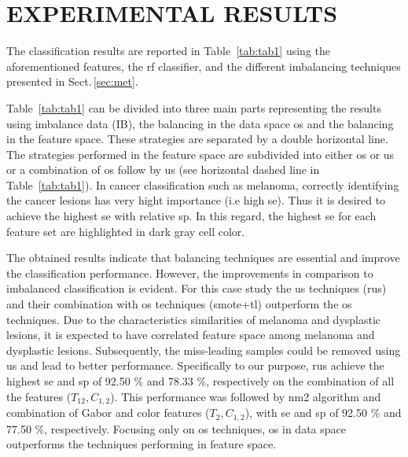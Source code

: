 \graphicspath{ {./content/Experiments-results/figures/} }


\section{\uppercase{Experimental Results}}
\label{sec:exp-res} 

\noindent The classification results are reported in Table~\ref{tab:tab1} using the aforementioned features, the \ac{rf} classifier, and the different imbalancing techniques presented in Sect.\,\ref{sec:met}. 



Table~\ref{tab:tab1} can be divided into three main parts representing the results using imbalance data (IB), the balancing in the data space \ac{os} and the balancing in the feature space.
These strategies are separated by a double horizontal line.
The strategies performed in the feature space are subdivided into either \ac{os} or \ac{us} or a combination of \ac{os} follow by \ac{us} (see horizontal dashed line in Table~\ref{tab:tab1}).
In cancer classification such as melanoma, correctly identifying the cancer lesions has very hight importance (i.e high \ac{se}). 
Thus it is desired to achieve the highest \ac{se} with relative \ac{sp}. 
In this regard, the highest \ac{se} for each feature set are highlighted in dark gray cell color. 

The obtained results indicate that balancing techniques are essential and improve the classification performance. 
However, the improvements in comparison to imbalanced classification is evident. 
For this case study the \ac{us} techniques (\ac{rus}) and their combination with \ac{os} techniques (\ac{smote}+\ac{tl}) outperform the \ac{os} techniques. 
Due to the characteristics similarities of melanoma and dysplastic lesions, it is expected to have correlated feature space among melanoma and dysplastic lesions. 
Subsequently, the miss-leading samples could be removed using \ac{us} and lead to better performance.
Specifically to our purpose, \ac{rus} achieve the highest \ac{se} and \ac{sp} of 92.50 \% and 78.33 \%, respectively on the combination of all the features ($T_{12}, C_{1,2}$). 
This performance was followed by \ac{nm2} algorithm and combination of Gabor and color features ($T_{2}, C_{1,2}$), with \ac{se} and \ac{sp} of 92.50 \% and 77.50 \%, respectively.  
Focusing only on \ac{os} techniques, \ac{os} in data space outperforms the techniques performing in feature space.

